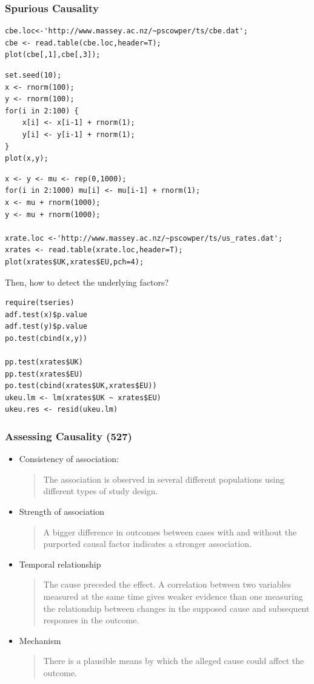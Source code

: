 \documentclass[hyperref={colorlinks=false},handout,10pt]{beamer}
\let\olditem\item
\renewcommand{\item}{\setlength{\itemsep}{0.5\baselineskip}\olditem}
\begin{document}
\begin{frame}
    \frametitle{Spurious Causality}

    \begin{lstlisting}
cbe.loc<-'http://www.massey.ac.nz/~pscowper/ts/cbe.dat';
cbe <- read.table(cbe.loc,header=T);
plot(cbe[,1],cbe[,3]);
    \end{lstlisting}

    \begin{lstlisting}
set.seed(10);
x <- rnorm(100);
y <- rnorm(100);
for(i in 2:100) {
    x[i] <- x[i-1] + rnorm(1);
    y[i] <- y[i-1] + rnorm(1);
}
plot(x,y);
    \end{lstlisting}
    \vskip0.5in

    \begin{lstlisting}
x <- y <- mu <- rep(0,1000);
for(i in 2:1000) mu[i] <- mu[i-1] + rnorm(1);
x <- mu + rnorm(1000);
y <- mu + rnorm(1000);

xrate.loc <-'http://www.massey.ac.nz/~pscowper/ts/us_rates.dat';
xrates <- read.table(xrate.loc,header=T);
plot(xrates$UK,xrates$EU,pch=4);
    \end{lstlisting}
    \vskip0.5in
    Then, how to detect the underlying factors? 
    \begin{lstlisting}
require(tseries)
adf.test(x)$p.value
adf.test(y)$p.value
po.test(cbind(x,y))

pp.test(xrates$UK)
pp.test(xrates$EU)
po.test(cbind(xrates$UK,xrates$EU))
ukeu.lm <- lm(xrates$UK ~ xrates$EU)
ukeu.res <- resid(ukeu.lm)
    \end{lstlisting}
\end{frame}

\begin{frame}
    \frametitle{Assessing Causality (527)}
    \begin{itemize}
        \item Consistency of association: 
            \begin{verse}
The association is observed in several different
populations using different types of study design. 
\end{verse}
        \item Strength of association
            \begin{verse}
A bigger difference in outcomes between cases with and without the purported
causal factor indicates a stronger association.
\end{verse}
        \item Temporal relationship
            \begin{verse}
The
cause preceded the effect. A correlation between two variables measured at the
same time gives weaker evidence than one measuring the relationship between
changes in the supposed cause and subsequent responses in the outcome. 
\end{verse}
        \item Mechanism
            \begin{verse}
There is a plausible means by which the alleged cause could affect
the outcome.
\end{verse}
    \end{itemize}
\end{frame}
\end{document}
